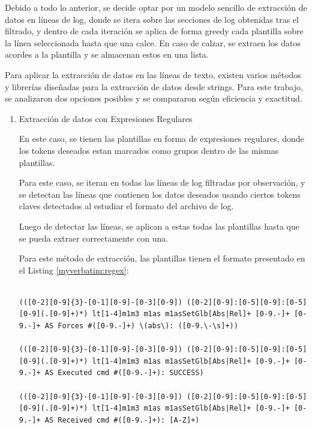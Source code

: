 \begin{enumerate}
Debido a todo lo anterior, se decide optar por un modelo sencillo de extracción de datos en líneas de log, donde se itera sobre las secciones de log obtenidas tras el filtrado, y dentro de cada iteración se aplica de forma greedy cada plantilla sobre la línea seleccionada hasta que una calce. En caso de calzar, se extraen los datos acordes a la plantilla y se almacenan estos en una lista.

Para aplicar la extracción de datos en las líneas de texto, existen varios métodos y librerías diseñadas para la extracción de datos desde strings. Para este trabajo, se analizaron dos opciones posibles y se compararon según eficiencia y exactitud.

\begin{enumerate}

    \item{Extracción de datos con Expresiones Regulares}
    
    En este caso, se tienen las plantillas en forma de expresiones regulares, donde los tokens deseados estan marcados como grupos dentro de las mismas plantillas.

    Para este caso, se iteran en todas las líneas de log filtradas por observación, y se detectan las líneas que contienen los datos deseados usando ciertos tokens claves detectados al estudiar el formato del archivo de log.

    Luego de detectar las líneas, se aplican a estas todas las plantillas hasta que se pueda extraer correctamente con una.

    Para este método de extracción, las plantillas tienen el formato presentado en el Listing \ref{myverbatim:regex}:

    \begin{listing}
        \caption{\label{myverbatim:regex} Plantillas Regex}
        \begin{verbatim}

(([0-2][0-9]{3}-[0-1][0-9]-[0-3][0-9]) ([0-2][0-9]:[0-5][0-9]:[0-5][0-9](.[0-9]+)*) lt[1-4]m1m3 m1as m1asSetGlb[Abs|Rel]+ [0-9.-]+ [0-9.-]+ AS Forces #([0-9.-]+) \(abs\): ([0-9.\-\s]+))

(([0-2][0-9]{3}-[0-1][0-9]-[0-3][0-9]) ([0-2][0-9]:[0-5][0-9]:[0-5][0-9](.[0-9]+)*) lt[1-4]m1m3 m1as m1asSetGlb[Abs|Rel]+ [0-9.-]+ [0-9.-]+ AS Executed cmd #([0-9.-]+): SUCCESS)

(([0-2][0-9]{3}-[0-1][0-9]-[0-3][0-9]) ([0-2][0-9]:[0-5][0-9]:[0-5][0-9](.[0-9]+)*) lt[1-4]m1m3 m1as m1asSetGlb[Abs|Rel]+ [0-9.-]+ [0-9.-]+ AS Received cmd #([0-9.-]+): [A-Z]+)


\end{verbatim}
\end{listing}
\end{enumerate}
\end{enumerate}
